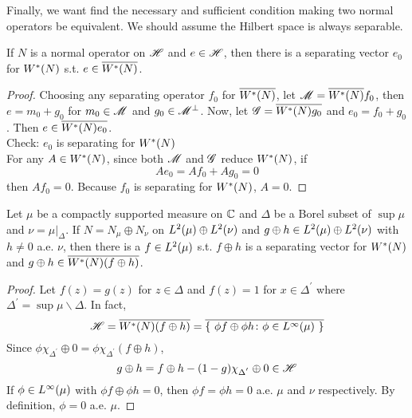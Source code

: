 \documentclass[a4paper,11pt]{report}
\begin{document}
Finally, we want find the necessary and sufficient condition making two normal operators be equivalent. We should assume the Hilbert space is always separable.

\begin{prop}
	If $N$ is a normal operator on $\mathscr{H}$ and $e \in \mathscr{H}$, then there is a separating vector $e_0$ for $W^{*}(N)$ s.t. $e \in \overline{W^{*}(N)}$.
\end{prop}
\begin{proof}
	Choosing any separating operator $f_0$ for $\overline{W^{*}(N)}$, let $\mathscr{M} = \overline{W^{*}(N)}f_0$, then $e = m_0 + g_0$ for $m_0 \in \mathscr{M}$ and $g_0 \in \mathscr{M}^{\bot}$. Now, let $\mathscr{G} = \overline{W^{*}(N)g_0}$ and $e_0 = f_0 +g_0$. Then $e \in \overline{W^{*}(N)e_0}$.\\
	Check: $e_0$ is separating for $W^{*}(N)$\\
	For any $A \in W^{*}(N)$, since both $\mathscr{M}$ and $\mathscr{G}$ reduce $W^{*}(N)$, if
	\begin{equation*}
		Ae_0 = Af_0 + Ag_0 = 0
	\end{equation*}
	then $Af_0=0$. Because $f_0$ is separating for $W^{*}(N)$, $A = 0$.
\end{proof}

\begin{prop}
	Let $\mu$ be a compactly supported measure on $\mathbb{C}$ and $\Delta$ be a Borel subset of $\sup{\mu}$ and $\nu = \mu|_{\Delta}$. If $N = N_{\mu} \oplus N_{\nu}$ on $L^{2}(\mu) \oplus L^{2}(\nu)$ and $g\oplus h \in L^{2}(\mu) \oplus L^{2}(\nu)$ with $h \neq 0$ a.e. $\nu$, then there is a $f \in L^{2}(\mu)$ s.t. $f \oplus h$ is a separating vector for $W^{*}(N)$ and $g\oplus h \in \overline{W^{*}(N)(f \oplus h)}$.
\end{prop}
\begin{proof}
	Let $f(z) = g(z)$ for $z \in \Delta$ and $f(z) = 1$ for $x \in \Delta^{'}$ where $\Delta^{'} = \sup{\mu} \backslash \Delta$. In fact,
	\begin{equation*}
		\mathscr{H} = \overline{W^{*}(N)(f \oplus h)} = \overline{\{~\phi f \oplus \phi h \colon \phi \in L^{\infty}(\mu)~\}}
	\end{equation*}
	Since $\phi \chi_{\Delta^{'}} \oplus 0 = \phi \chi_{\Delta^{'}}(f \oplus h)$,
	\begin{equation*}
		g \oplus h = f \oplus h - (1-g)\chi_{\Delta^{'}} \oplus 0 \in \mathscr{H}
	\end{equation*}
	If $\phi \in L^{\infty}(\mu)$ with $\phi f \oplus \phi h = 0$, then $\phi f = \phi h = 0$ a.e. $\mu$ and $\nu$ respectively. By definition, $\phi = 0$ a.e. $\mu$.
\end{proof}
\end{document}
